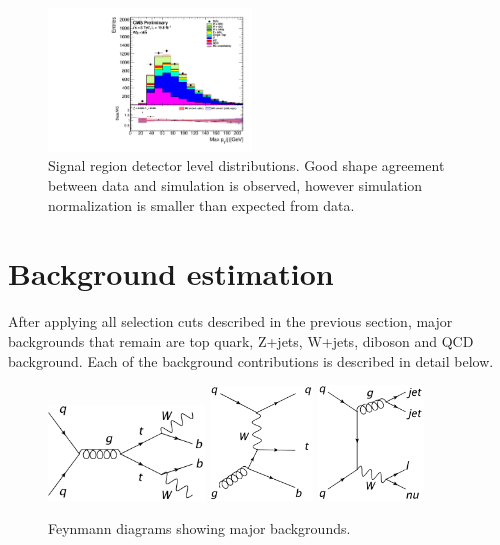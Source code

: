 \begin{figure}[htbp]
		\includegraphics[width=0.48\textwidth]{Figures/Results/Electron/prefit/Wbb_max_hJet_pt_doQCD1.pdf}		
	\caption[Signal region detector level distributions.]{Signal region detector level distributions. Good shape agreement between data and simulation is observed, however simulation normalization is smaller than expected from data.}
	\label{fig:Wbb_prefit_electron}
\end{figure}


\section{Background estimation}
\label{sec:background}
After applying all selection cuts described in the previous section, major backgrounds that remain are top quark, Z+jets, W+jets, diboson and QCD background. Each of the background contributions is described in detail below. 

\begin{figure}[htbp]
	\centering
		\includegraphics[width=0.37\textwidth]{Figures/FD-tt.png}
		\includegraphics[width=0.245\textwidth]{Figures/FD-st.png}
		\includegraphics[width=0.25\textwidth]{Figures/FD-WJ.png}
	\caption[Feynmann diagrams showing major backgrounds]{Feynmann diagrams showing major backgrounds.}
	\label{fig:backgrounds}
\end{figure}

